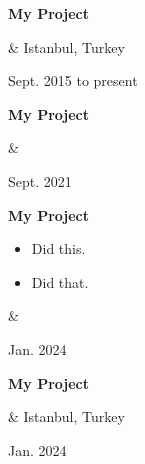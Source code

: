 \documentclass[10pt, letterpaper]{article}
\newenvironment{highlights}{
        \begin{itemize}[
                topsep=0pt,
                parsep=0.10 cm,
                partopsep=0pt,
                itemsep=0pt,
                after=\relax,
                leftmargin=0.4 cm + 3pt
            ]
    }{
        \end{itemize}
    } %
\let\originalTabularx\tabularx
\let\originalEndTabularx\endtabularx
\renewenvironment{tabularx}{\bgroup\centering\originalTabularx}{\originalEndTabularx\par\egroup}
\begin{document}
        \vspace{0.2 cm}
        \begin{tabularx}{
            \textwidth-0.4 cm-0.13cm
        }{
            K{0.2 cm}
            R{4.1 cm}
        }
            \textbf{My Project}

            \vspace{0.10 cm}

            &
            Istanbul, Turkey

            Sept. 2015 to present
        \end{tabularx}


        \vspace{0.2 cm}
        \begin{tabularx}{
            \textwidth-0.4 cm-0.13cm
        }{
            K{0.2 cm}
            R{4.1 cm}
        }
            \textbf{My Project}

            \vspace{0.10 cm}

            &
            

            Sept. 2021
        \end{tabularx}


        \vspace{0.2 cm}
        \begin{tabularx}{
            \textwidth-0.4 cm-0.13cm
        }{
            K{0.2 cm}
            R{4.1 cm}
        }
            \textbf{My Project}

            \vspace{0.10 cm}

            \begin{highlights}
                \item Did this.
                \item Did that.
            \end{highlights}
            &
            

            Jan. 2024
        \end{tabularx}


        \vspace{0.2 cm}
        \begin{tabularx}{
            \textwidth-0.4 cm-0.13cm
        }{
            K{0.2 cm}
            R{4.1 cm}
        }
            \textbf{My Project}

            \vspace{0.10 cm}

            &
            Istanbul, Turkey

            Jan. 2024
        \end{tabularx}
\end{document}
